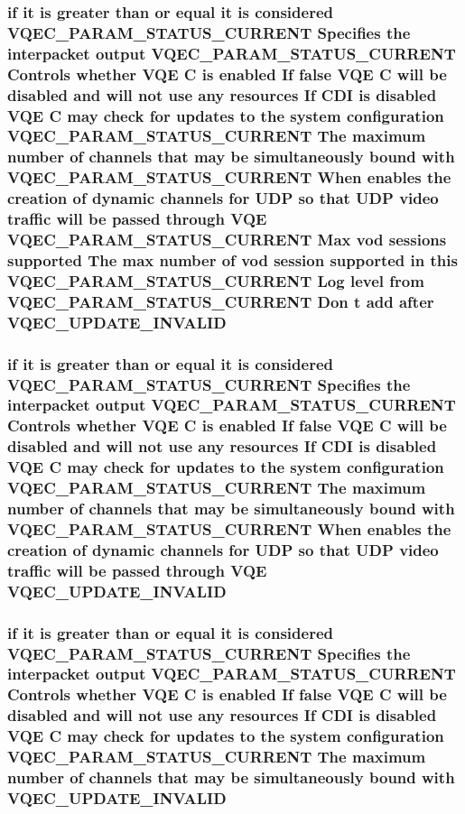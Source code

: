 \subsubsection{\setlength{\rightskip}{0pt plus 5cm}if it is greater than or equal it is considered VQEC\_\-PARAM\_\-STATUS\_\-CURRENT Specifies the interpacket output VQEC\_\-PARAM\_\-STATUS\_\-CURRENT Controls whether VQE \bf{C} is enabled If false VQE \bf{C} will be disabled and will not use any resources If CDI is disabled VQE \bf{C} may check for updates \bf{to} the system configuration VQEC\_\-PARAM\_\-STATUS\_\-CURRENT The maximum number of \bf{channels} that may be simultaneously bound with VQEC\_\-PARAM\_\-STATUS\_\-CURRENT When enables the creation of dynamic \bf{channels} for UDP so that UDP video traffic will be passed through VQE VQEC\_\-PARAM\_\-STATUS\_\-CURRENT Max vod sessions supported The max number of vod session supported in \bf{this} VQEC\_\-PARAM\_\-STATUS\_\-CURRENT Log level from VQEC\_\-PARAM\_\-STATUS\_\-CURRENT Don t add after \bf{VQEC\_\-UPDATE\_\-INVALID}}\label{vqec__cfg__settings_8h_d9d86950dd4680a3da2f0e21df311026}


\subsubsection{\setlength{\rightskip}{0pt plus 5cm}if it is greater than or equal it is considered VQEC\_\-PARAM\_\-STATUS\_\-CURRENT Specifies the interpacket output VQEC\_\-PARAM\_\-STATUS\_\-CURRENT Controls whether VQE \bf{C} is enabled If false VQE \bf{C} will be disabled and will not use any resources If CDI is disabled VQE \bf{C} may check for updates \bf{to} the system configuration VQEC\_\-PARAM\_\-STATUS\_\-CURRENT The maximum number of \bf{channels} that may be simultaneously bound with VQEC\_\-PARAM\_\-STATUS\_\-CURRENT When enables the creation of dynamic \bf{channels} for UDP so that UDP video traffic will be passed through VQE \bf{VQEC\_\-UPDATE\_\-INVALID}}\label{vqec__cfg__settings_8h_53a5adc14a3b681c6fca440c51498a23}


\subsubsection{\setlength{\rightskip}{0pt plus 5cm}if it is greater than or equal it is considered VQEC\_\-PARAM\_\-STATUS\_\-CURRENT Specifies the interpacket output VQEC\_\-PARAM\_\-STATUS\_\-CURRENT Controls whether VQE \bf{C} is enabled If false VQE \bf{C} will be disabled and will not use any resources If CDI is disabled VQE \bf{C} may check for updates \bf{to} the system configuration VQEC\_\-PARAM\_\-STATUS\_\-CURRENT The maximum number of \bf{channels} that may be simultaneously bound with \bf{VQEC\_\-UPDATE\_\-INVALID}}\label{vqec__cfg__settings_8h_cde1abf2bd4b2d9e97381b47dc25b01e}


